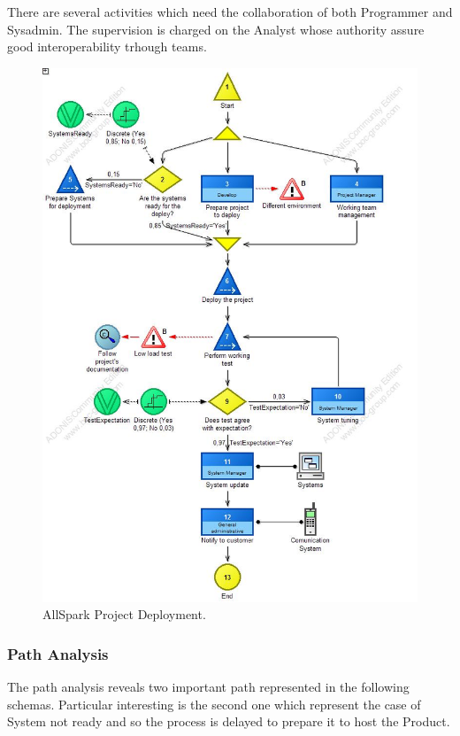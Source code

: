 There are several activities which need the collaboration of both Programmer and Sysadmin. The supervision is charged on the Analyst whose authority assure good interoperability trhough teams.

\begin{figure}[ht!]
\begin{centering}
\includegraphics[scale=0.50]{assign2/adonis/imgs/deploy.jpg}
\caption{AllSpark Project Deployment.}
\label{2img:deploy}
\end{centering}
\end{figure}


\subsubsection{Path Analysis}
The path analysis reveals two important path represented in the following schemas. Particular interesting is the second one which represent the case of System not ready and so the process is delayed to prepare it to host the Product.

